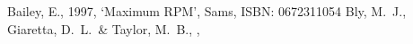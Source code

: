 %
% 
%
%
\begin{references}

 Bailey, E., 1997, `Maximum RPM', Sams, ISBN: 0672311054
 Bly, M.\ J., Giaretta, D.\ L.\ \& Taylor, M.\ B., \adassxii, 

\end{references}


